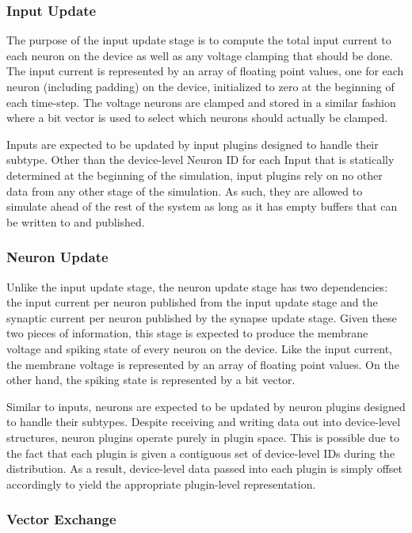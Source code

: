\subsubsection{Input Update}

The purpose of the input update stage is to compute the
total input current to each neuron on the device as well as any voltage
clamping that should be done. The input current is represented by an
array of floating point values, one for each neuron (including padding)
on the device, initialized to zero at the beginning of each time-step. The
voltage neurons are clamped and stored in a similar fashion where a bit
vector is used to select which neurons should actually be clamped.

Inputs are expected to be updated by input plugins designed to handle
their subtype. Other than the device-level Neuron ID for each Input that
is statically determined at the beginning of the simulation, input plugins
rely on no other data from any other stage of the simulation. As such,
they are allowed to simulate ahead of the rest of the system as long as
it has empty buffers that can be written to and published.

\subsubsection{Neuron Update}

Unlike the input update stage, the neuron update stage has two
dependencies: the input current per neuron published from the input update
stage and the synaptic current per neuron published by the synapse update
stage. Given these two pieces of information, this stage is expected to
produce the membrane voltage and spiking state of every neuron on the
device. Like the input current, the membrane voltage is represented by
an array of floating point values. On the other hand, the spiking state
is represented by a bit vector.

Similar to inputs, neurons are expected to be updated by neuron plugins
designed to handle their subtypes. Despite receiving and writing data out
into device-level structures, neuron plugins operate purely in plugin
space. This is possible due to the fact that each plugin is given a
contiguous set of device-level IDs during the distribution. As a result,
device-level data passed into each plugin is simply offset accordingly
to yield the appropriate plugin-level representation.

\subsubsection{Vector Exchange}

